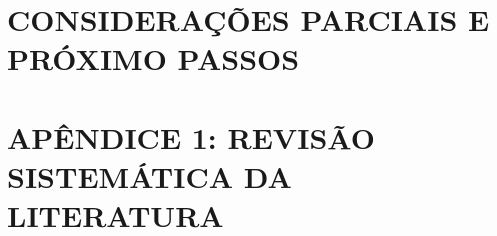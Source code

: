 \documentclass[
	12pt,				%
  oneside,
	a4paper,			%
	chapter=TITLE,		%
	english,			%
	brazil				%
	]{abntex2}
\begin{document}
\chapter{CONSIDERAÇÕES PARCIAIS E PRÓXIMO PASSOS}


\chapter{APÊNDICE 1: REVISÃO SISTEMÁTICA DA LITERATURA}




\printindex
\end{document}
